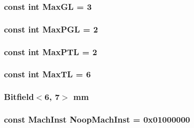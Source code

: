 \label{namespaceSparcISA_a8f4ba87c53caab23396d3b86b672b0fb}
\hypertarget{namespaceSparcISA_af56470bc16dfc33549217225934bcd23}{
\subsubsection[{MaxGL}]{\setlength{\rightskip}{0pt plus 5cm}const int {\bf MaxGL} = 3}}
\label{namespaceSparcISA_af56470bc16dfc33549217225934bcd23}
\hypertarget{namespaceSparcISA_a1a64618a48f1b54d7c50a02b322cba4c}{
\subsubsection[{MaxPGL}]{\setlength{\rightskip}{0pt plus 5cm}const int {\bf MaxPGL} = 2}}
\label{namespaceSparcISA_a1a64618a48f1b54d7c50a02b322cba4c}
\hypertarget{namespaceSparcISA_adcffeac928f8e9f6b317518b5f789181}{
\subsubsection[{MaxPTL}]{\setlength{\rightskip}{0pt plus 5cm}const int {\bf MaxPTL} = 2}}
\label{namespaceSparcISA_adcffeac928f8e9f6b317518b5f789181}
\hypertarget{namespaceSparcISA_a8d6a6b2e04f9b3ebcec03466060ff24a}{
\subsubsection[{MaxTL}]{\setlength{\rightskip}{0pt plus 5cm}const int {\bf MaxTL} = 6}}
\label{namespaceSparcISA_a8d6a6b2e04f9b3ebcec03466060ff24a}
\hypertarget{namespaceSparcISA_a972c8e9e2b84cfa215016e3a75909c66}{
\subsubsection[{mm}]{\setlength{\rightskip}{0pt plus 5cm}Bitfield$<$6, 7$>$ {\bf mm}}}
\label{namespaceSparcISA_a972c8e9e2b84cfa215016e3a75909c66}
\hypertarget{namespaceSparcISA_a636df3d1cbf44a747182aa98c4f89429}{
\subsubsection[{NoopMachInst}]{\setlength{\rightskip}{0pt plus 5cm}const {\bf MachInst} {\bf NoopMachInst} = 0x01000000}}
